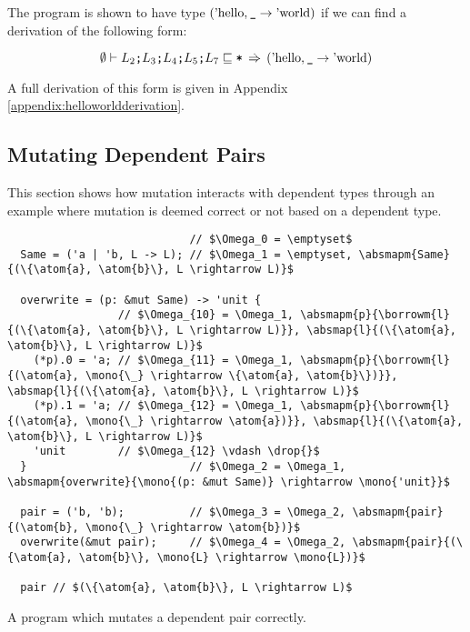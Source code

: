 \documentclass[12pt,twoside]{report}
\begin{document}
The program is shown to have type $(\text{'hello}, \text{\texttt{\_}} \rightarrow \text{'world})$ if we can find a derivation of the following form:

\[
\emptyset \vdash L_2\text{\texttt{;}}L_3\text{\texttt{;}}L_4\text{\texttt{;}}L_5\text{\texttt{;}}L_7 \sqsubseteq \text{\texttt{*}} \,\stackrel{.}{\Rightarrow}\, (\text{'hello}, \text{\texttt{\_}} \rightarrow \text{'world})
\]

A full derivation of this form is given in Appendix  \ref{appendix:helloworldderivation}.

\subsection{Mutating Dependent Pairs}
\label{section:mutatingpairs}
This section shows how mutation interacts with dependent types through an example where mutation is deemed correct or not based on a dependent type.

\begin{listing}
\begin{verbatim}
                            // $\Omega_0 = \emptyset$
  Same = ('a | 'b, L -> L); // $\Omega_1 = \emptyset, \absmapm{Same}{(\{\atom{a}, \atom{b}\}, L \rightarrow L)}$

  overwrite = (p: &mut Same) -> 'unit {
                 // $\Omega_{10} = \Omega_1, \absmapm{p}{\borrowm{l}{(\{\atom{a}, \atom{b}\}, L \rightarrow L)}}, \absmap{l}{(\{\atom{a}, \atom{b}\}, L \rightarrow L)}$
    (*p).0 = 'a; // $\Omega_{11} = \Omega_1, \absmapm{p}{\borrowm{l}{(\atom{a}, \mono{\_} \rightarrow \{\atom{a}, \atom{b}\})}}, \absmap{l}{(\{\atom{a}, \atom{b}\}, L \rightarrow L)}$
    (*p).1 = 'a; // $\Omega_{12} = \Omega_1, \absmapm{p}{\borrowm{l}{(\atom{a}, \mono{\_} \rightarrow \atom{a})}}, \absmap{l}{(\{\atom{a}, \atom{b}\}, L \rightarrow L)}$
    'unit        // $\Omega_{12} \vdash \drop{}$
  }                         // $\Omega_2 = \Omega_1, \absmapm{overwrite}{\mono{(p: &mut Same)} \rightarrow \mono{'unit}}$

  pair = ('b, 'b);          // $\Omega_3 = \Omega_2, \absmapm{pair}{(\atom{b}, \mono{\_} \rightarrow \atom{b})}$
  overwrite(&mut pair);     // $\Omega_4 = \Omega_2, \absmapm{pair}{(\{\atom{a}, \atom{b}\}, \mono{L} \rightarrow \mono{L})}$

  pair // $(\{\atom{a}, \atom{b}\}, L \rightarrow L)$
\end{verbatim}
\caption{A program which mutates a dependent pair correctly.}
\label{listing:mutatedependent}
\end{listing}
\end{document}

